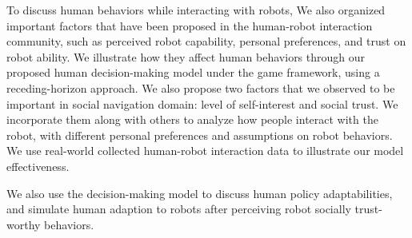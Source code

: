 \documentclass[letterpaper, 10 pt, conference]{ieeeconf}  %
\begin{document}
To discuss human behaviors while interacting with robots, We also organized 
important factors that have been proposed in the human-robot interaction 
community, such as perceived robot capability, personal preferences, and 
trust on robot ability. We illustrate how they affect human behaviors through 
our proposed human decision-making model under the game framework, using a 
receding-horizon approach. We also propose two factors that we observed to be 
important in social navigation 
domain: level of self-interest and social trust. We incorporate them along 
with others to analyze how people interact with the robot, with different 
personal preferences and assumptions on robot 
behaviors. We use real-world collected human-robot interaction data to 
illustrate our model effectiveness. 

We also use the decision-making model to discuss human policy adaptabilities,
and simulate human adaption to robots after perceiving robot 
socially trust-worthy behaviors. 



\end{document}
